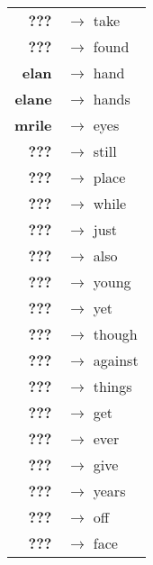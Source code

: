 \begin{tabular}{rl}
\textbf{???} & $\rightarrow$ take \\
\textbf{???} & $\rightarrow$ found \\
\textbf{elan} & $\rightarrow$ hand \\
\textbf{elane} & $\rightarrow$ hands \\
\textbf{mrile} & $\rightarrow$ eyes \\
\textbf{???} & $\rightarrow$ still \\
\textbf{???} & $\rightarrow$ place \\
\textbf{???} & $\rightarrow$ while \\
\textbf{???} & $\rightarrow$ just \\
\textbf{???} & $\rightarrow$ also \\
\textbf{???} & $\rightarrow$ young \\
\textbf{???} & $\rightarrow$ yet \\
\textbf{???} & $\rightarrow$ though \\
\textbf{???} & $\rightarrow$ against \\
\textbf{???} & $\rightarrow$ things \\
\textbf{???} & $\rightarrow$ get \\
\textbf{???} & $\rightarrow$ ever \\
\textbf{???} & $\rightarrow$ give \\
\textbf{???} & $\rightarrow$ years \\
\textbf{???} & $\rightarrow$ off \\
\textbf{???} & $\rightarrow$ face \\
\end{tabular}


